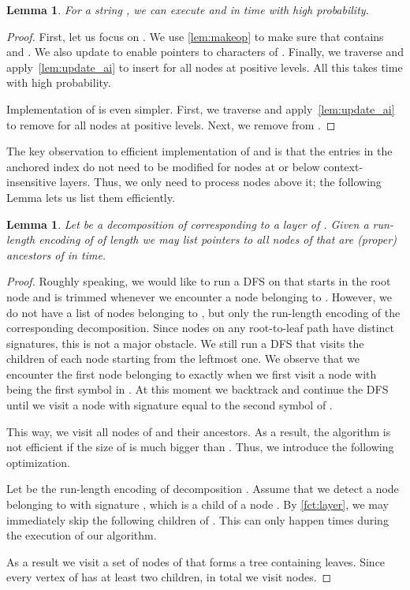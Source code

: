 \documentclass[a4paper]{article}
\newtheorem{lemma}[theorem]{Lemma}
\theoremstyle{remark}
\begin{document}
\begin{lemma}\label{lem:makeopn}
For a string , we can execute  and  in  time
with high probability.
\end{lemma}

\begin{proof}
First, let us focus on . We use \cref{lem:makeop} to make sure that  contains  and .
We also update  to enable pointers to characters of .
Finally, we traverse  and apply~\cref{lem:update_ai} to insert  for all nodes  at positive levels.
All this takes  time with high probability.

Implementation of  is even simpler. First, we traverse   and apply~\cref{lem:update_ai} to remove 
for all nodes  at positive levels. Next, we remove  from .
\end{proof}

The key observation to efficient implementation of  and 
is that the entries in the anchored index do not need to be modified for nodes at or below context-insensitive layers.
Thus, we only need to process nodes above it; the following Lemma lets us list them efficiently.
\begin{lemma}\label{lem:list-above}
Let  be a decomposition of  corresponding to a layer  of .
Given a run-length encoding of  of length  we may list pointers to all nodes of  that are (proper) ancestors of  in
 time.
\end{lemma}
\begin{proof}
Roughly speaking, we would like to run a DFS on  that starts in the root node and is trimmed whenever we encounter a node belonging to .
However, we do not have a list of nodes belonging to , but only the run-length encoding of the corresponding decomposition.
Since nodes on any root-to-leaf path have distinct signatures, this is not a major obstacle.
We still run a DFS that visits the children of each node starting from the leftmost one.
We observe that we encounter the first node belonging to  exactly when we first visit a node  with  being the first symbol in . At this moment we backtrack and continue the DFS until we visit a node with signature equal to the second symbol of .

This way, we visit all nodes of  and their ancestors.
As a result, the algorithm is not efficient if the size of  is much bigger than .
Thus, we introduce the following optimization.

Let  be the run-length encoding of decomposition .
Assume that we detect a node belonging to  with signature , which is a child of a node .
By \cref{fct:layer}, we may immediately skip the following  children of .
This can only happen  times during the execution of our algorithm.

As a result we visit a set of nodes of  that forms a tree containing  leaves.
Since every vertex of  has at least two children, in total we visit  nodes.
\end{proof}
\end{document}
